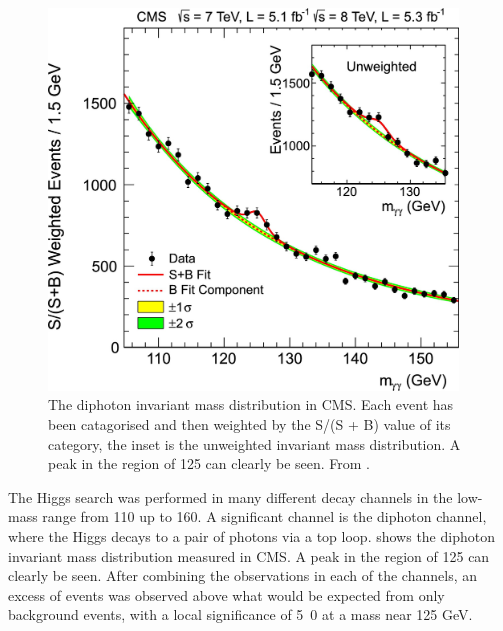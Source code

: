 \begin{figure}[htbp]
  \centering
  \includegraphics[width=0.97\textwidth]{higgs}
  \caption{The diphoton invariant mass distribution in CMS.  Each event has been
catagorised and then weighted by the S/(S + B) value of its category, the inset
is the unweighted invariant mass distribution. A peak in the region of \unit{125}{\GeV} can
clearly be seen. From \cite{chatrchyan2012observation}. }
  \label{fig:hgg}
\end{figure}

The Higgs search was performed in many different decay channels in the
low-mass range from 110 up to \unit{160}{\GeV}. A significant channel is the
diphoton channel, where the Higgs decays to a pair of photons via a top loop.
 shows the diphoton invariant mass distribution measured in CMS.
A peak in the region of \unit{125}{\GeV} can clearly be seen. 
After combining the observations in each of the channels, an excess of events
was observed above what would be expected from only background events, with a
local signiﬁcance of \unit{5.0}{\sigma} at a mass near 125 GeV.

